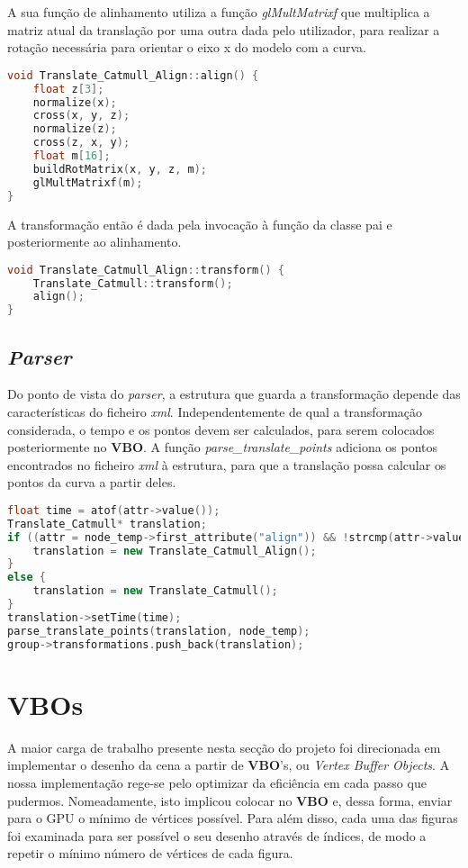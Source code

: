 \documentclass[14pt, a4 paper]{report}
\begin{document}
A sua função de alinhamento utiliza a função \textit{glMultMatrixf} que multiplica a matriz atual da translação por uma outra dada pelo utilizador, para realizar a rotação necessária para orientar o eixo x do modelo com a curva.

\begin{lstlisting}[language = c++]
void Translate_Catmull_Align::align() {
    float z[3];
    normalize(x);
    cross(x, y, z);
    normalize(z);
    cross(z, x, y);
    float m[16];
    buildRotMatrix(x, y, z, m);
    glMultMatrixf(m);
}
\end{lstlisting}

A transformação então é dada pela invocação à função da classe pai e posteriormente ao alinhamento.

\begin{lstlisting}[language = c++]
void Translate_Catmull_Align::transform() {
    Translate_Catmull::transform();
    align();
}
\end{lstlisting}

\subsection{\textit{Parser}}

Do ponto de vista do \textit{parser}, a estrutura que guarda a transformação depende das características do ficheiro \textit{xml}. Independentemente de qual a transformação considerada, o tempo e os pontos devem ser calculados, para serem colocados posteriormente no \textbf{VBO}. A função \textit{parse\_translate\_points} adiciona os pontos encontrados no ficheiro \textit{xml} à estrutura, para que a translação possa calcular os pontos da curva a partir deles.

\begin{lstlisting}[language = c++]
float time = atof(attr->value());
Translate_Catmull* translation;
if ((attr = node_temp->first_attribute("align")) && !strcmp(attr->value(), "True")) {
    translation = new Translate_Catmull_Align();
}
else {
    translation = new Translate_Catmull();
}        
translation->setTime(time);
parse_translate_points(translation, node_temp);
group->transformations.push_back(translation);
\end{lstlisting}

\section{\textbf{VBO}s}

A maior carga de trabalho presente nesta secção do projeto foi direcionada em implementar o desenho da cena a partir de \textbf{VBO}'s, ou \textit{Vertex Buffer Objects}. A nossa implementação rege-se pelo optimizar da eficiência em cada passo que pudermos. Nomeadamente, isto implicou colocar no \textbf{VBO} e, dessa forma, enviar para o GPU o mínimo de vértices possível. Para além disso, cada uma das figuras foi examinada para ser possível o seu desenho através de índices, de modo a repetir o mínimo número de vértices de cada figura. 
\end{document}
